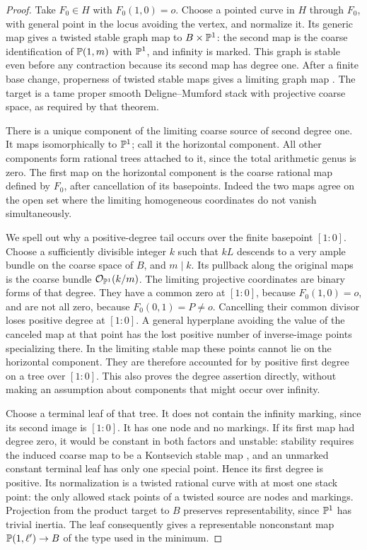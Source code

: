 \begin{proof}
Take \(F_0\in H\) with \(F_0(1,0)=o\).  Choose a pointed curve in
\(H\) through \(F_0\), with general point in the locus avoiding the
vertex, and normalize it.  Its generic map gives a twisted stable
graph map to \(B\times\mathbb P^1\): the second map is the coarse
identification of \(\mathbb P(1,m)\) with \(\mathbb P^1\), and infinity is marked.
This graph is stable even before any contraction because its second
map has degree one.  After a finite base change, properness of twisted
stable maps gives a limiting graph map
\cite[Theorem~4.3]{AOV11}.  The target is a tame proper smooth
Deligne--Mumford stack with projective coarse space, as required by
that theorem.

There is a unique component of the limiting coarse source of second
degree one.  It maps isomorphically to \(\mathbb P^1\); call it the
horizontal component.  All other components form rational trees
attached to it, since the total arithmetic genus is zero.
The first map on the horizontal component is the coarse rational
map defined by \(F_0\), after cancellation of its basepoints.
Indeed the two maps agree on the open set where the limiting
homogeneous coordinates do not vanish simultaneously.

We spell out why a positive-degree tail occurs over the finite
basepoint \([1:0]\).  Choose a sufficiently divisible integer \(k\)
such that \(kL\) descends to a very ample bundle on the coarse space
of \(B\), and \(m\mid k\).  Its pullback along the original maps is
the coarse bundle \(\mathcal O_{\mathbb P^1}(k/m)\).  The limiting projective
coordinates are binary forms of that degree.  They have a common
zero at \([1:0]\), because \(F_0(1,0)=o\), and are not all zero,
because \(F_0(0,1)=P\ne o\).  Cancelling their common divisor loses
positive degree at \([1:0]\).  A general hyperplane avoiding the
value of the canceled map at that point has the lost positive number
of inverse-image points specializing there.  In the limiting stable
map these points cannot lie on the horizontal component.  They are
therefore accounted for by positive first degree on a tree over
\([1:0]\).  This also proves the degree assertion directly, without
making an assumption about components that might occur over
infinity.

Choose a terminal leaf of that tree.  It does not contain the
infinity marking, since its second image is \([1:0]\).  It has one
node and no markings.  If its first map had degree zero, it would be
constant in both factors and unstable: stability requires the induced
coarse map to be a Kontsevich stable map
\cite[Section~4]{AOV11}, and an unmarked constant terminal leaf has
only one special point. Hence its first degree is
positive.  Its normalization is a twisted rational curve with at
most one stack point: the only allowed stack points of a twisted
source are nodes and markings.  Projection from the product target
to \(B\) preserves representability, since \(\mathbb P^1\) has trivial
inertia.  The leaf consequently gives a representable nonconstant
map \(\mathbb P(1,\ell')\to B\) of the type used in the minimum.


\end{proof}
